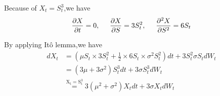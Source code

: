 Because of $X_t = S_t^3$,we have
$$ \frac{\partial X}{\partial t}=0, \hspace{0.5cm}
\frac{\partial X}{\partial S}=3S_t^2, \hspace{0.5cm}
\frac{\partial^2 X}{\partial S^2}=6S_t $$

By applying It\^{o} lemma,we have
\begin{equation}
  \begin{aligned}
  dX_t &= (\mu S_t \times 3S_t^2+\frac{1}{2} \times 6S_t  \times \sigma^2 S_t^2)dt+3S_t^2\sigma S_tdW_t \\
       &= (3\mu + 3\sigma^2)S_t^3dt + 3\sigma S_t^3dW_t \\
       &\overset{\mathrm{X_t=S_t^3}}{=}3(\mu^2+\sigma^2)X_tdt +3\sigma X_t dW_t
  \end{aligned}
\end{equation}
